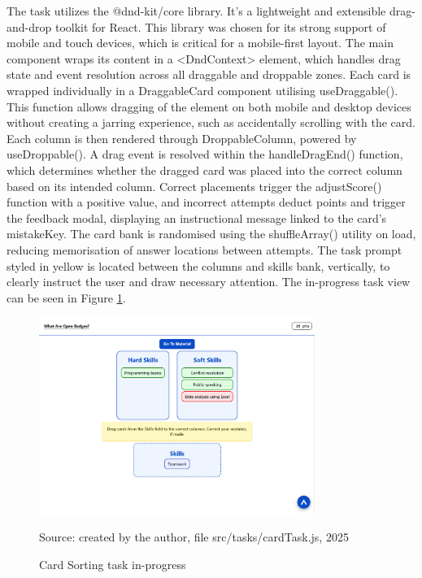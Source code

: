 The task utilizes the @dnd-kit/core library.
It's a lightweight and extensible drag-and-drop toolkit for React. 
This library was chosen for its strong support of mobile and touch devices, which is critical for a mobile-first layout. 
The main component wraps its content in a <DndContext> element, which handles drag state and event resolution across all draggable and droppable zones. 
Each card is wrapped individually in a DraggableCard component utilising useDraggable(). 
This function allows dragging of the element on both mobile and desktop devices without creating a jarring experience, such as accidentally scrolling with the card. 
Each column is then rendered through DroppableColumn, powered by useDroppable().
A drag event is resolved within the handleDragEnd() function, which determines whether the dragged card was placed into the correct column based on its intended column. 
Correct placements trigger the adjustScore() function with a positive value, and incorrect attempts deduct points and trigger the feedback modal, displaying an instructional message linked to the card’s mistakeKey. 
The card bank is randomised using the shuffleArray() utility on load, reducing memorisation of answer locations between attempts.
The task prompt styled in yellow is located between the columns and skills bank, vertically, to clearly instruct the user and draw necessary attention.
The in-progress task view can be seen in Figure \ref{fig:cardTask}.

\begin{figure}[hbtp]
\centering
\includegraphics[width=0.8\textwidth]{Media/cards.png}
\caption{Card Sorting task in-progress}
\label{fig:cardTask}
{\raggedright \small{Source: created by the author, file src/tasks/cardTask.js}, 2025\par}
\end{figure}

